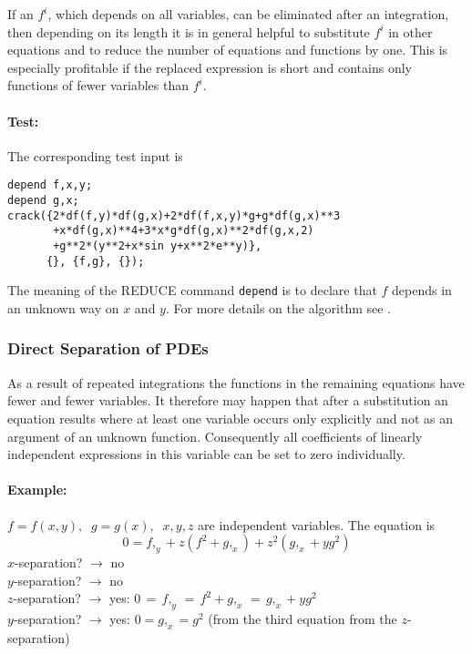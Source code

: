If an $f^i$, which depends on all variables, can be eliminated after
an integration, then depending on its length it is in general helpful
to substitute $f^i$ in other equations and to reduce the number of
equations and functions by one.  This is especially profitable if the
replaced expression is short and contains only functions of fewer
variables than $f^i$.

\paragraph*{Test:}

The corresponding test input is
\begin{verbatim}
depend f,x,y;
depend g,x;
crack({2*df(f,y)*df(g,x)+2*df(f,x,y)*g+g*df(g,x)**3
       +x*df(g,x)**4+3*x*g*df(g,x)**2*df(g,x,2)
       +g**2*(y**2+x*sin y+x**2*e**y)},
      {}, {f,g}, {});
\end{verbatim}
The meaning of the REDUCE command \texttt{depend} is to declare that
$f$ depends in an unknown way on $x$ and $y$.  For more details on the
algorithm see \cite{Wolf:2000}.

\subsubsection{Direct Separation of PDEs}

As a result of repeated integrations the functions in the remaining
equations have fewer and fewer variables.  It therefore may happen
that after a substitution an equation results where at least one
variable occurs only explicitly and not as an argument of an unknown
function.  Consequently all coefficients of linearly independent
expressions in this variable can be set to zero individually.

\paragraph*{Example:}

$f = f(x,y), \;\; g = g(x), \;\; x,y,z$ are independent variables.
The equation is
\begin{equation}
0 = f,_y + z(f^2+g,_x) + z^2(g,_x+yg^2) \label{crack-sep}
\end{equation}
$x$-separation? $\rightarrow$ no \\
$y$-separation? $\rightarrow$ no \\
$z$-separation? $\rightarrow$ yes: $0 \,=\, f,_y \,=\, f^2+g,_x \,=\,
g,_x+yg^2$ \\
$y$-separation? $\rightarrow$ yes: $0 = g,_x = g^2$
(from the third equation from the $z$-separation)

